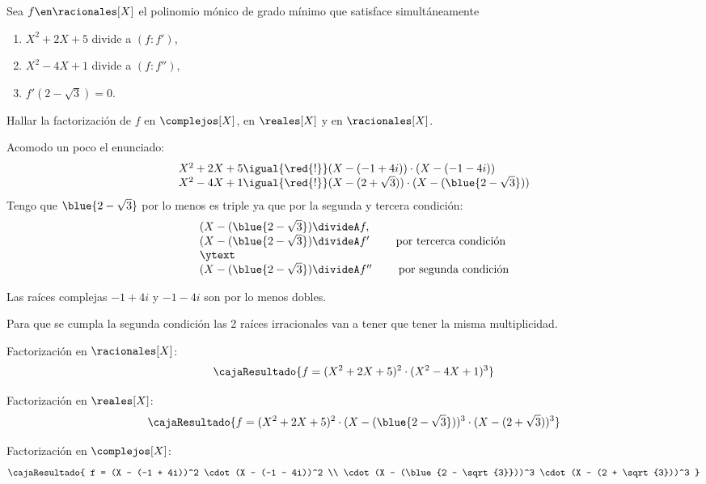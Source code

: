 \begin{enunciado}{\ejExtra}
	Sea $f \en \racionales[X]$ el polinomio mónico de grado mínimo que satisface simultáneamente
	\begin{enumerate}[label={\tiny $\blacksquare$}]
		\item $X^2 + 2X + 5$ divide a $(f:f')$,
		\item $X^2 - 4X + 1$ divide a $(f:f'')$,
		\item $f'(2-\sqrt{3}) = 0$.
	\end{enumerate}
	Hallar la factorización de $f$ en $\complejos[X]$, en $\reales[X]$ y en $\racionales[X]$.
\end{enunciado}

Acomodo un poco el enunciado:
$$
	\begin{array}{l}
		X^2 + 2X + 5
		\igual{\red{!}}
		(X - (-1 + 4i)) \cdot (X - (-1 - 4i))                  \\
		X^2 -4 X + 1
		\igual{\red{!}}
		(X - (2 + \sqrt{3})) \cdot (X - (\blue{2 - \sqrt{3}})) \\
	\end{array}
$$
Tengo que $\blue{2 - \sqrt{3}}$ por lo menos es triple ya que por la segunda y tercera condición:
$$
	\begin{array}{l}
		(X - (\blue{2 - \sqrt{3}}) \divideA f                                        , \\
		(X - (\blue{2 - \sqrt{3}}) \divideA f' \qquad \text{ por tercerca condición}   \\
		\ytext                                                                         \\
		(X - (\blue{2 - \sqrt{3}}) \divideA f'' \qquad \text{ por segunda condición}   \\
	\end{array}
$$

Las raíces complejas $-1+4i$ y $-1 - 4i$ son por lo menos dobles.

\bigskip

Para que se cumpla la segunda condición las 2 raíces irracionales van a tener que tener la misma multiplicidad.

\medskip

Factorización en $\racionales[X]$:
$$
	\cajaResultado{
		f =
		(X^2 + 2X + 5)^2
		\cdot
		(X^2 - 4X + 1)^3
	}
$$

Factorización en $\reales[X]$:
$$
	\cajaResultado{
		f =
		(X^2 + 2X + 5)^2
		\cdot
		(X - (\blue{2 - \sqrt{3}}))^3
		\cdot
		(X - (2 + \sqrt{3}))^3
	}
$$

Factorización en $\complejos[X]$:
$$
	\cajaResultado{
		f =
		(X - (-1 + 4i))^2 \cdot (X - (-1 - 4i))^2                  \\
		\cdot
		(X - (\blue{2 - \sqrt{3}}))^3
		\cdot
		(X - (2 + \sqrt{3}))^3
	}
$$
\begin{aportes}
	\item {}
\end{aportes}
